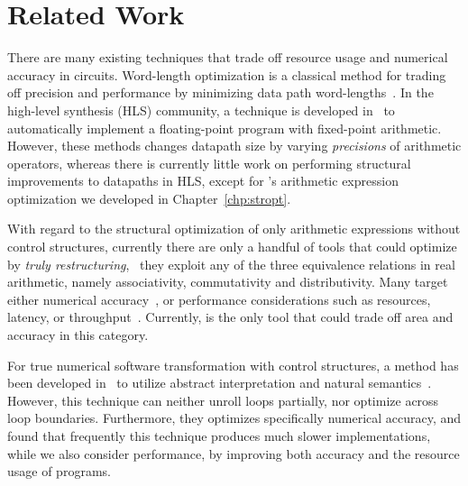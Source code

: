 \section{Related Work}
\label{sec:related_work}

There are many existing techniques that trade off resource usage and
numerical accuracy in circuits.  Word-length optimization is a classical
method for trading off precision and performance by minimizing data path
word-lengths~\cite{constantinides}.  In the high-level synthesis (HLS)
community, a technique is developed in~\cite{menard12} to automatically
implement a floating-point program with fixed-point arithmetic.  However,
these methods changes datapath size by varying \emph{precisions} of arithmetic
operators, whereas there is currently little work on performing structural
improvements to datapaths in HLS, except for \soap{}'s arithmetic expression
optimization we developed in Chapter~\ref{chp:stropt}.

With regard to the structural optimization of only arithmetic expressions
without control structures, currently there are only a handful of tools that
could optimize by \emph{truly restructuring}, \ie~they exploit any of the three
equivalence relations in real arithmetic, namely associativity, commutativity
and distributivity.  Many target either numerical accuracy~\cite{martel07,
ioualalen}, or performance considerations such as resources, latency, or
throughput~\cite{gcc, llvm, vivado_hls, mouilleron, hosangadi, peymandoust}.
Currently, \soap{} is the only tool that could trade off area and accuracy in
this category.

For true numerical software transformation with control structures, a
method has been developed in~\cite{martel09} to utilize abstract interpretation
and natural semantics~\cite{kahn87}.  However, this technique can neither
unroll loops partially, nor optimize across loop boundaries.  Furthermore,
they optimizes specifically numerical accuracy, and found that frequently
this technique produces much slower implementations, while we also consider
performance, by improving both accuracy and the resource usage of programs.

